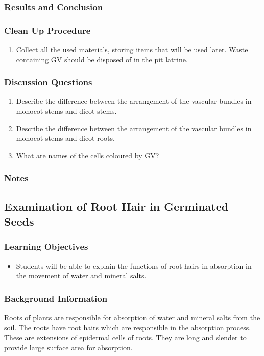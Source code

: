 \subsubsection*{Results and Conclusion}


\subsubsection*{Clean Up Procedure}
\begin{enumerate}
\item{Collect all the used materials, storing items that will be used later. Waste containing GV should be disposed of in the pit latrine.}
\end{enumerate}

\subsubsection*{Discussion Questions}
\begin{enumerate}
\item{Describe the difference between the arrangement of the vascular bundles in monocot stems and dicot stems.}
\item{Describe the difference between the arrangement of the vascular bundles in monocot stems and dicot roots.}
\item{What are names of the cells coloured by GV?}
\end{enumerate}

\subsubsection*{Notes}

\subsection{Examination of Root Hair in Germinated Seeds}

\subsubsection*{Learning Objectives}
\begin{itemize}
\item{Students will be able to explain the functions of root hairs in absorption in the movement of water and mineral salts.}
\end{itemize}

\subsubsection*{Background Information}
Roots of plants are responsible for absorption of water and mineral salts from the soil. The roots have root hairs which are responsible in the absorption process. These are extensions of epidermal cells of roots. They are long and slender to provide large surface area for absorption.

